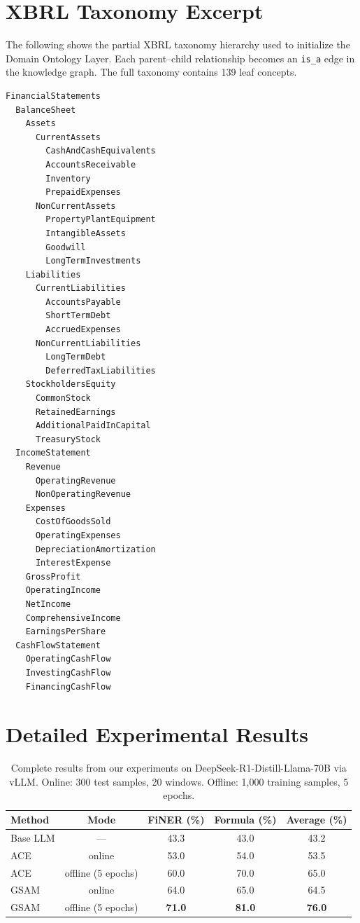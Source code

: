 \documentclass[12pt,a4paper,oneside]{article}
\begin{document}
\section{XBRL Taxonomy Excerpt}
\label{app:xbrl}

The following shows the partial XBRL taxonomy hierarchy used to initialize the Domain Ontology Layer. Each parent--child relationship becomes an \texttt{is\_a} edge in the knowledge graph. The full taxonomy contains 139 leaf concepts.

\begin{lstlisting}[caption={Partial XBRL taxonomy hierarchy.}]
FinancialStatements
  BalanceSheet
    Assets
      CurrentAssets
        CashAndCashEquivalents
        AccountsReceivable
        Inventory
        PrepaidExpenses
      NonCurrentAssets
        PropertyPlantEquipment
        IntangibleAssets
        Goodwill
        LongTermInvestments
    Liabilities
      CurrentLiabilities
        AccountsPayable
        ShortTermDebt
        AccruedExpenses
      NonCurrentLiabilities
        LongTermDebt
        DeferredTaxLiabilities
    StockholdersEquity
      CommonStock
      RetainedEarnings
      AdditionalPaidInCapital
      TreasuryStock
  IncomeStatement
    Revenue
      OperatingRevenue
      NonOperatingRevenue
    Expenses
      CostOfGoodsSold
      OperatingExpenses
      DepreciationAmortization
      InterestExpense
    GrossProfit
    OperatingIncome
    NetIncome
    ComprehensiveIncome
    EarningsPerShare
  CashFlowStatement
    OperatingCashFlow
    InvestingCashFlow
    FinancingCashFlow
\end{lstlisting}

\section{Detailed Experimental Results}
\label{app:detailed}

\begin{table}[H]
\centering
\caption{Complete results from our experiments on DeepSeek-R1-Distill-Llama-70B via vLLM. Online: 300 test samples, 20 windows. Offline: 1{,}000 training samples, 5 epochs.}
\label{tab:full-results}
\small
\begin{tabular}{@{}lcccc@{}}
\toprule
\textbf{Method} & \textbf{Mode} & \textbf{FiNER (\%)} & \textbf{Formula (\%)} & \textbf{Average (\%)} \\
\midrule
Base LLM & --- & 43.3 & 43.0 & 43.2 \\
\midrule
ACE & online & 53.0 & 54.0 & 53.5 \\
ACE & offline (5 epochs) & 60.0 & 70.0 & 65.0 \\
\midrule
GSAM & online & 64.0 & 65.0 & 64.5 \\
GSAM & offline (5 epochs) & \textbf{71.0} & \textbf{81.0} & \textbf{76.0} \\
\bottomrule
\end{tabular}
\end{table}
\end{document}
